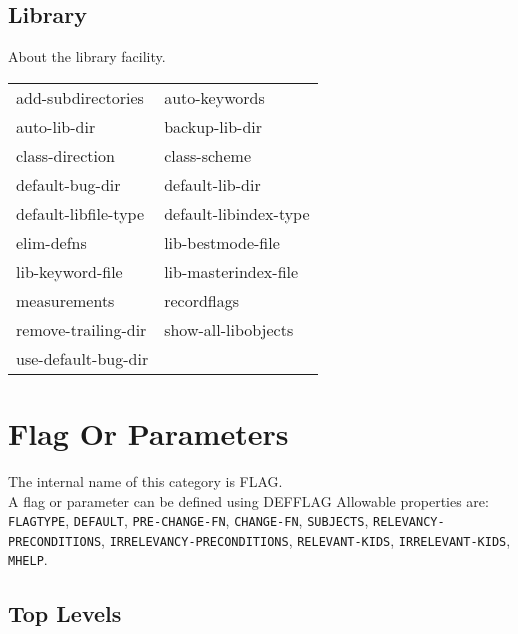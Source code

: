 \section{Library}

\begin{description} 
\item[LIBRARY]  
About the library facility.

\begin{tabular}{l l}
add-subdirectories&auto-keywords\\
auto-lib-dir&backup-lib-dir\\
class-direction&class-scheme\\
default-bug-dir&default-lib-dir\\
default-libfile-type&default-libindex-type\\
elim-defns&lib-bestmode-file\\
lib-keyword-file&lib-masterindex-file\\
measurements&recordflags\\
remove-trailing-dir&show-all-libobjects\\
use-default-bug-dir
\end{tabular}
\item
\end{description}
\chapter{Flag Or Parameters}
The internal name of this category is 
FLAG.\\
A flag or parameter can be defined using DEFFLAG%
Allowable properties are: \texttt{FLAGTYPE}, \texttt{DEFAULT}, \texttt{PRE-CHANGE-FN}, \texttt{CHANGE-FN}, \texttt{SUBJECTS}, \texttt{RELEVANCY-PRECONDITIONS}, \texttt{IRRELEVANCY-PRECONDITIONS}, \texttt{RELEVANT-KIDS}, \texttt{IRRELEVANT-KIDS}, \texttt{MHELP}.

\section{Top Levels}

